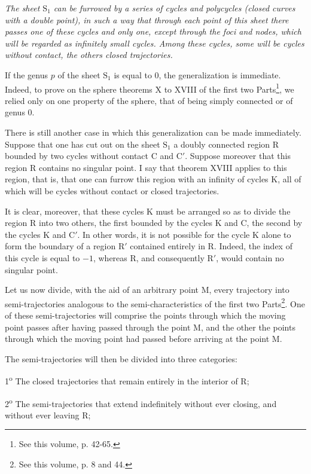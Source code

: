 \documentclass[11pt]{article}
\begin{document}
\emph{The sheet $\mathrm{S}_1$ can be furrowed by a series of cycles and polycycles (closed curves with a double point), in such a way that through each point of this sheet there passes one of these cycles and only one, except through the foci and nodes, which will be regarded as infinitely small cycles. Among these cycles, some will be cycles without contact, the others closed trajectories.}

If the genus $p$ of the sheet $\mathrm{S}_1$ is equal to 0, the generalization is immediate. Indeed, to prove on the sphere theorems X to XVIII of the first two Parts\footnote{See this volume, p. 42-65.}, we relied only on one property of the sphere, that of being simply connected or of genus 0.

There is still another case in which this generalization can be made immediately. Suppose that one has cut out on the sheet $\mathrm{S}_1$ a doubly connected region R bounded by two cycles without contact C and C$'$. Suppose moreover that this region R contains no singular point. I say that theorem XVIII applies to this region, that is, that one can furrow this region with an infinity of cycles K, all of which will be cycles without contact or closed trajectories.

It is clear, moreover, that these cycles K must be arranged so as to divide the region R into two others, the first bounded by the cycles K and C, the second by the cycles K and C$'$. In other words, it is not possible for the cycle K alone to form the boundary of a region R$'$ contained entirely in R. Indeed, the index of this cycle is equal to $-1$, whereas R, and consequently R$'$, would contain no singular point.

Let us now divide, with the aid of an arbitrary point M, every trajectory into semi-trajectories analogous to the semi-characteristics of the first two Parts\footnote{See this volume, p. 8 and 44.}. One of these semi-trajectories will comprise the points through which the moving point passes after having passed through the point M, and the other the points through which the moving point had passed before arriving at the point M.

The semi-trajectories will then be divided into three categories:

1\textsuperscript{o} The closed trajectories that remain entirely in the interior of R;

2\textsuperscript{o} The semi-trajectories that extend indefinitely without ever closing, and without ever leaving R;
\end{document}
